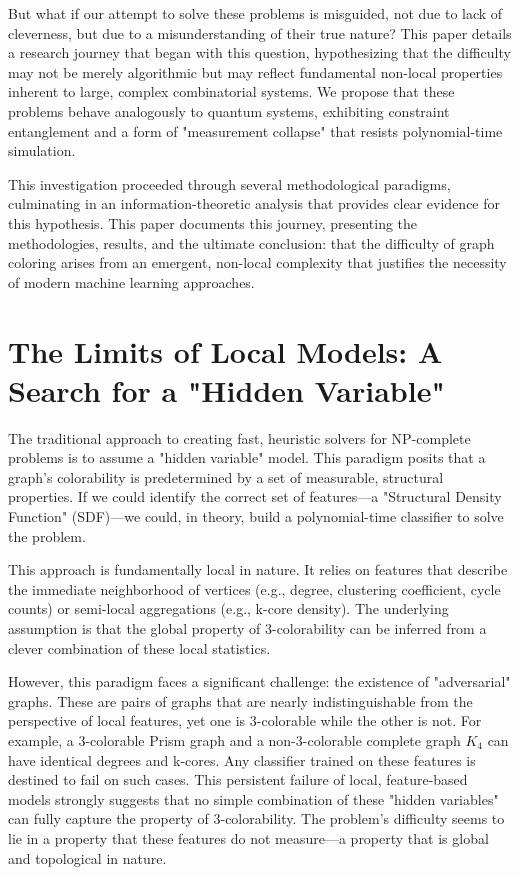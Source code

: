 \documentclass[12pt, letterpaper]{article}
\begin{document}
But what if our attempt to solve these problems is misguided, not due to lack of cleverness, but due to a misunderstanding of their true nature? This paper details a research journey that began with this question, hypothesizing that the difficulty may not be merely algorithmic but may reflect fundamental non-local properties inherent to large, complex combinatorial systems. We propose that these problems behave analogously to quantum systems, exhibiting constraint entanglement and a form of "measurement collapse" that resists polynomial-time simulation.

This investigation proceeded through several methodological paradigms, culminating in an information-theoretic analysis that provides clear evidence for this hypothesis. This paper documents this journey, presenting the methodologies, results, and the ultimate conclusion: that the difficulty of graph coloring arises from an emergent, non-local complexity that justifies the necessity of modern machine learning approaches.

\section{The Limits of Local Models: A Search for a "Hidden Variable"}

The traditional approach to creating fast, heuristic solvers for NP-complete problems is to assume a "hidden variable" model. This paradigm posits that a graph's colorability is predetermined by a set of measurable, structural properties. If we could identify the correct set of features—a "Structural Density Function" (SDF)—we could, in theory, build a polynomial-time classifier to solve the problem.

This approach is fundamentally local in nature. It relies on features that describe the immediate neighborhood of vertices (e.g., degree, clustering coefficient, cycle counts) or semi-local aggregations (e.g., k-core density). The underlying assumption is that the global property of 3-colorability can be inferred from a clever combination of these local statistics.

However, this paradigm faces a significant challenge: the existence of "adversarial" graphs. These are pairs of graphs that are nearly indistinguishable from the perspective of local features, yet one is 3-colorable while the other is not. For example, a 3-colorable Prism graph and a non-3-colorable complete graph $K_4$ can have identical degrees and k-cores. Any classifier trained on these features is destined to fail on such cases. This persistent failure of local, feature-based models strongly suggests that no simple combination of these "hidden variables" can fully capture the property of 3-colorability. The problem's difficulty seems to lie in a property that these features do not measure—a property that is global and topological in nature.
\end{document}
